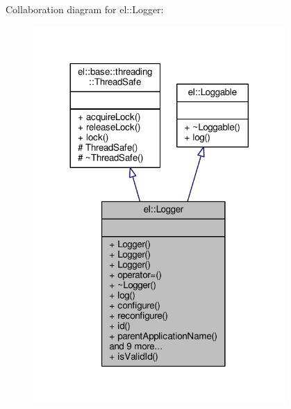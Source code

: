 Collaboration diagram for el\+:\+:Logger\+:
\nopagebreak
\begin{figure}[H]
\begin{center}
\leavevmode
\includegraphics[width=272pt]{d5/dcf/classel_1_1Logger__coll__graph}
\end{center}
\end{figure}
